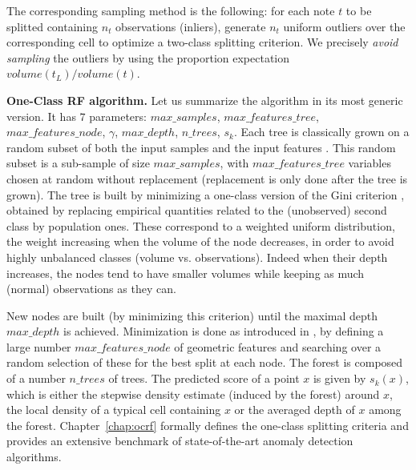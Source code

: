 \begin{remarque}
The corresponding sampling method is the following: for each note $t$ to be splitted containing $n_t$ observations (inliers), generate $n_t$ uniform outliers over the corresponding cell to optimize a two-class splitting criterion. We precisely \emph{avoid sampling} the outliers by using the proportion expectation $volume(t_L)/volume(t)$.
\end{remarque}



\textbf{One-Class RF algorithm.} Let us summarize the algorithm in its most generic version.
It has $7$ parameters:
$max\_samples$, $max\_features\_tree$, $max\_features\_node$, $\gamma$, $max\_depth$, $n\_trees$, $s_k$.
%
Each tree is classically grown on a random subset of both the input samples and the input features \citep{Ho1998, Panov2007}.
This random subset is a sub-sample of size $max\_samples$, with $max\_features\_tree$ variables chosen at random without replacement (replacement is only done after the tree is grown). The tree is built by minimizing 
a one-class version of the Gini criterion \citep{Gini1912}, obtained by replacing empirical quantities related to the (unobserved) second class by population ones. These correspond to a weighted uniform distribution, the weight increasing when the volume of the node decreases, in order to avoid highly unbalanced classes (volume vs. observations). Indeed when their depth increases, the nodes tend to have smaller volumes while keeping as much (normal) observations as they can.

New nodes are built (by minimizing this criterion) until the maximal depth $max\_depth$ is achieved.
Minimization is done as introduced in \citep{Amit1997}, by defining a large number $max\_features\_node$ of geometric features and searching over a random selection of these for the best split at each node.
%
The forest is composed of a number $n\_trees$ of trees. The predicted score of a point $x$ is given by $s_k(x)$, which is either the stepwise density estimate (induced by the forest) around $x$, the local density of a typical cell containing $x$ or the averaged depth of $x$ among the forest. Chapter~\ref{chap:ocrf} formally defines the one-class splitting criteria and provides an extensive benchmark of state-of-the-art anomaly detection algorithms.








